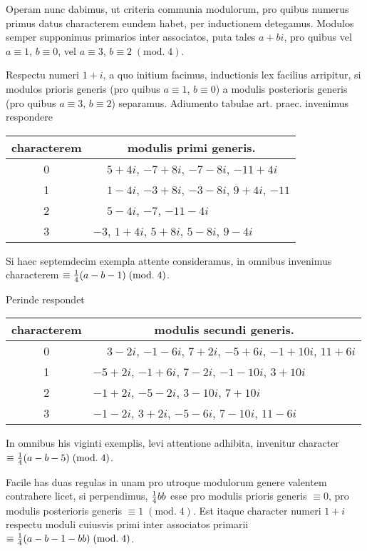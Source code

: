 \documentclass[twoside,12pt]{memoir}
\renewcommand{\pmod}[1]{\;(\textrm{mod.}\;#1)}
\let\oldfrac\frac
\def\frac#1#2{\mathchoice{\tfrac{#1}{#2}}{\oldfrac{#1}{#2}}{\genfrac{}{}{}{2}{#1}{#2\mathstrut}}{\genfrac{}{}{}{3}{#1}{#2\mathstrut}}}
\begin{document}
Operam nunc dabimus, ut criteria communia modulorum, pro quibus numerus primus datus characterem eundem habet, per inductionem detegamus. Modulos semper supponimus primarios inter associatos, puta tales \(a+b i\), pro quibus vel \(a \equiv 1\), \( b \equiv 0\), vel \(a \equiv 3\), \( b \equiv 2\pmod{4}\).
 
Respectu numeri \(1+i\), a quo initium facimus, inductionis lex facilius arripitur, si modulos prioris generis (pro quibus \(a \equiv 1\), \( b \equiv 0\)) a modulis posterioris generis (pro quibus \(a \equiv 3\), \( b \equiv 2\)) separamus. Adiumento tabulae art. praec. invenimus respondere\pagebreak%
\begin{center}
\begin{tabular}{c|l}
characterem & \multicolumn{1}{c}{modulis primi generis.} \\
\hline
0 & \(\phantom{+}5+4 i\), \(-7+8 i\), \(-7-8 i\), \(-11+4 i\) \\
1 & \(\phantom{+}1-4 i\), \(-3+8 i\), \(-3-8 i\), \( 9+4i\), \(-11\) \\
2 & \(\phantom{+}5-4 i\), \(-7\), \(-11-4 i\) \\
3 & \(-3\), \(1+4 i\), \( 5+8 i\), \( 5-8 i\), \( 9-4 i\) \\
\end{tabular}
\end{center}
Si haec septemdecim exempla attente consideramus, in omnibus invenimus characterem \(\equiv \frac{1}{4}(a-b-1)\pmod{4}\).

Perinde respondet
\begin{center}
\begin{tabular}{c|l}
characterem & \multicolumn{1}{c}{modulis secundi generis.} \\
\hline
0 & \(\phantom{+}3-2 i\), \(-1-6 i\), \( 7+2 i\), \(-5+6 i\), \(-1+10 i\), \( 11+6 i\) \\
1 & \(-5+2 i\), \(-1+6 i\), \( 7-2 i\), \(-1-10 i\), \( 3+10 i\) \\
2 & \(-1+2 i\), \(-5-2 i\), \( 3-10 i\), \( 7+10 i\) \\
3 & \(-1-2 i\), \( 3+2 i\), \(-5-6 i\), \( 7-10 i\), \( 11-6 i\) \\
\end{tabular}
\end{center}
In omnibus his viginti exemplis, levi attentione adhibita, invenitur character \(\equiv \frac{1}{4}(a-b-5)\pmod{4}\).

Facile has duas regulas in unam pro utroque modulorum genere valentem contrahere licet, si perpendimus, \(\frac{1}{4} b b\) esse pro modulis prioris generis \(\equiv 0\), pro modulis posterioris generis \(\equiv 1\pmod{4}\). Est itaque character numeri \(1+i\) respectu moduli cuiusvis primi inter associatos primarii \(\equiv \frac{1}{4}(a-b-1-b b)\pmod{4}\).
 
\end{document}
